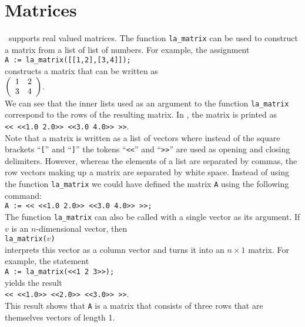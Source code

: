 \section{Matrices}
\setlx\ supports real valued matrices.  The function \texttt{la\_matrix} can be used to construct a
matrix from a list of list of numbers.  For example, the assignment
\\[0.2cm]
\hspace*{1.3cm}
\texttt{A := la\_matrix([[1,2],[3,4]]);}
\\[0.2cm]
constructs a matrix that can be written as
\\[0.2cm]
\hspace*{1.3cm}
$
\left(
\begin{array}[c]{ll}
  1 & 2 \\
  3 & 4
\end{array}
\right)
$.
\\[0.2cm]
We can see that the inner lists used as an argument to the function \texttt{la\_matrix} correspond
to the rows of the resulting matrix.   In \setlx, the matrix is printed as
\\[0.2cm]
\hspace*{1.3cm}
\texttt{<< <<1.0 2.0>> <<3.0 4.0>> >>}.
\\[0.2cm]
Note that a matrix is written as a list of vectors where instead of the square brackets
``\texttt{[}'' and ``\texttt{]}''  the tokens ``\texttt{<<}'' and
``\texttt{>>}'' are used as opening and closing delimiters.  However, whereas the elements of a list
are separated by commas, the row vectors making up a matrix are separated by white space.  
Instead of using the function \texttt{la\_matrix} we could have defined the matrix \texttt{A} using
the following command:
\\[0.2cm]
\hspace*{1.3cm}
\texttt{A := << <<1.0 2.0>> <<3.0 4.0>> >>;}
\\[0.2cm]  
The function \texttt{la\_matrix} can also be called with a single vector as its argument.  If $v$ is an
$n$-dimensional vector, then 
\\[0.2cm]
\hspace*{1.3cm}
\texttt{la\_matrix($v$)}
\\[0.2cm]
interprets this vector as a column vector and turns it into an $n \times 1$ matrix.  For example, 
the statement 
\\[0.2cm]
\hspace*{1.3cm}
\texttt{A := la\_matrix(<<1 2 3>>);}
\\[0.2cm]
yields the result
\\[0.2cm]
\hspace*{1.3cm}
\texttt{<< <<1.0>> <<2.0>> <<3.0>> >>}.
\\[0.2cm]
This result shows that \texttt{A} is a matrix that consists of three rows that are themselves
vectors of length 1.

